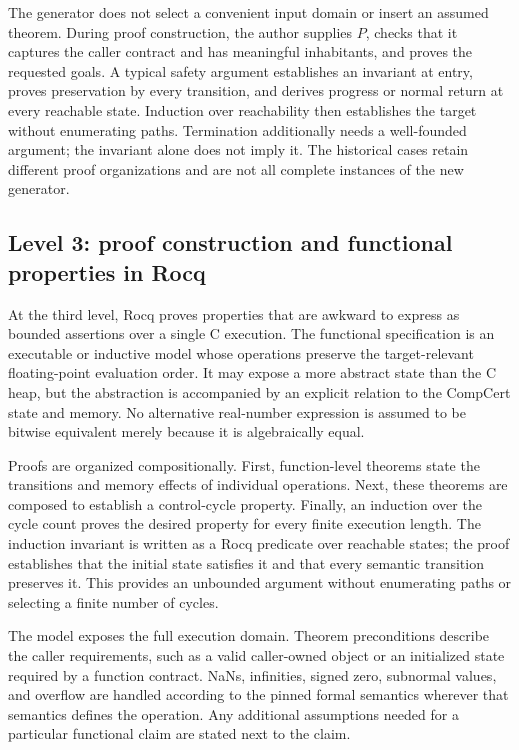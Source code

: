 \documentclass[manuscript, screen, review]{acmart}
\begin{document}
The generator does not select a convenient input domain or insert an
assumed theorem. During proof construction, the author supplies $P$, checks
that it captures the caller contract and has meaningful inhabitants, and
proves the requested goals. A typical safety argument establishes an
invariant at entry, proves preservation by every transition, and derives
progress or normal return at every reachable state. Induction over
reachability then establishes the target without enumerating paths.
Termination additionally needs a well-founded argument; the invariant
alone does not imply it. The historical cases retain different proof
organizations and are not all complete instances of the new generator.

\subsection{Level 3: proof construction and functional properties in Rocq}

At the third level, Rocq proves properties that are awkward to express as
bounded assertions over a single C execution. The functional specification
is an executable or inductive model whose operations preserve the
target-relevant floating-point evaluation order. It may expose a more
abstract state than the C heap, but the abstraction is accompanied by an
explicit relation to the CompCert state and memory. No alternative
real-number expression is assumed to be bitwise equivalent merely because
it is algebraically equal.

Proofs are organized compositionally. First, function-level theorems state
the transitions and memory effects of individual operations. Next, these
theorems are composed to establish a control-cycle property. Finally, an
induction over the cycle count proves the desired property for every finite
execution length. The induction invariant is written as a Rocq predicate
over reachable states; the proof establishes that the initial state
satisfies it and that every semantic transition preserves it. This provides
an unbounded argument without enumerating paths or selecting a finite
number of cycles.

The model exposes the full execution domain. Theorem preconditions
describe the caller requirements, such as a valid caller-owned object
or an initialized state required by a function contract. NaNs, infinities, signed zero, subnormal values, and overflow are
handled according to the pinned formal semantics wherever that semantics
defines the operation. Any additional assumptions needed for a particular
functional claim are stated next to the claim.
\end{document}
